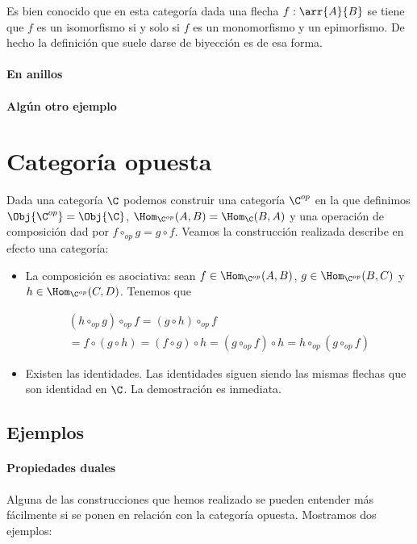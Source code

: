 Es bien conocido que en esta categoría dada una flecha
$f : \arr{A}{B}$ se tiene que $f$ es un isomorfismo si y
solo si $f$ es un monomorfismo y un epimorfismo. De hecho la definición
que suele darse de biyección es de esa forma.

\paragraph{En anillos}

\paragraph{Algún otro ejemplo}




\section{Categoría opuesta}
Dada una categoría $\C$ podemos construir una categoría
$\C^{op}$ en la que definimos $\Obj{\C^{op}} = \Obj{\C}$,
$\Hom_{\C^{op}}(A, B) = \Hom_{\C}(B, A)$ y una operación de
composición dad por $f \circ_{op} g = g \circ f$. Veamos
la construcción realizada describe en efecto una categoría:
\begin{itemize}
\item La composición es asociativa: sean
      $f \in \Hom_{\C^{op}}(A, B)$, $g \in \Hom_{\C^{op}}(B, C)$
      y $h \in \Hom_{\C^{op}}(C, D)$. Tenemos que

\begin{multline*}
(h \circ_{op} g) \circ_{op} f = (g \circ h) \circ_{op} f \\
                              = f \circ (g \circ h)
                              = (f \circ g) \circ h
                              = (g \circ_{op} f)  \circ h
                              = h \circ_{op} (g \circ_{op} f)
\end{multline*}
\item Existen las identidades. Las identidades siguen siendo
      las mismas flechas que son identidad en $\C$. La demostración
      es inmediata.
\end{itemize}

\subsection{Ejemplos}
\paragraph{Propiedades duales}
Alguna de las construcciones que hemos realizado se
pueden entender más fácilmente si se ponen
en relación con la categoría opuesta. Mostramos dos ejemplos:


